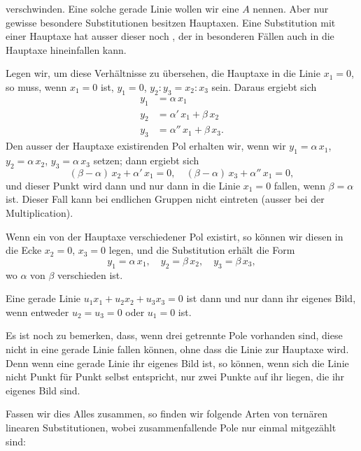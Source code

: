 verschwinden. Eine solche gerade Linie wollen wir eine  $A$ nennen. Aber nur gewisse besondere Substitutionen besitzen Hauptaxen. Eine Substitution mit einer Hauptaxe hat ausser dieser noch , der in besonderen F\"allen auch in die Hauptaxe hineinfallen kann.

Legen wir, um diese Verh\"altnisse zu \"ubersehen, die Hauptaxe in die Linie $x_1=0$, so muss, wenn $x_1=0$ ist, $y_1=0$, $y_2:y_3=x_2:x_3$ sein. Daraus ergiebt sich
\[
\begin{aligned}
y_1 &= \alpha\, x_1\\
y_2 &= \alpha'\, x_1 + \beta\, x_2\\
y_3 &= \alpha''\, x_1 + \beta\, x_3.
\end{aligned}
\]
Den ausser der Hauptaxe existirenden Pol erhalten wir, wenn wir $y_1=\alpha\,x_1$, $y_2=\alpha\,x_2$, $y_3=\alpha\,x_3$ setzen; dann ergiebt sich
\[
(\beta-\alpha)\,x_2+\alpha'\,x_1=0,\quad (\beta-\alpha)\,x_3+\alpha''\,x_1=0,
\]
und dieser Punkt wird dann und nur dann in die Linie $x_1=0$ fallen, wenn $\beta=\alpha$ ist. Dieser Fall kann bei endlichen Gruppen nicht eintreten (ausser bei der Multiplication).

Wenn ein von der Hauptaxe verschiedener Pol existirt, so k\"onnen wir diesen in die Ecke $x_2=0$, $x_3=0$ legen, und die Substitution erh\"alt die Form
\[
y_1=\alpha\,x_1,\quad y_2=\beta\,x_2,\quad y_3=\beta\,x_3,
\]
wo $\alpha$ von $\beta$ verschieden ist.

Eine gerade Linie $u_1x_1+u_2x_2+u_3x_3=0$ ist dann und nur dann ihr eigenes Bild, wenn entweder $u_2=u_3=0$ oder $u_1=0$ ist.


Es ist noch zu bemerken, dass, wenn drei getrennte Pole vorhanden sind, diese nicht in eine gerade Linie fallen k\"onnen, ohne dass die Linie zur Hauptaxe wird. Denn wenn eine gerade Linie ihr eigenes Bild ist, so k\"onnen, wenn sich die Linie nicht Punkt f\"ur Punkt selbst entspricht, nur zwei Punkte auf ihr liegen, die ihr eigenes Bild sind.

Fassen wir dies Alles zusammen, so finden wir folgende Arten von tern\"aren linearen Substitutionen, wobei zusammenfallende Pole nur einmal mitgez\"ahlt sind:
